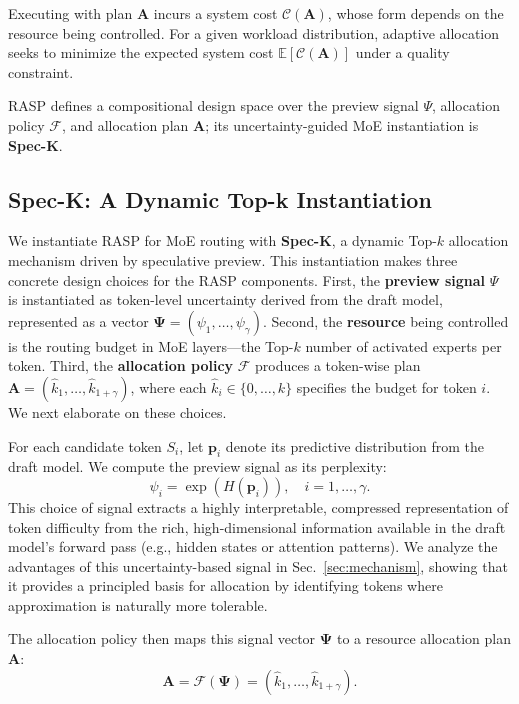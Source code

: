 \documentclass[conference]{IEEEtran}
\theoremstyle{definition} %
\begin{document}
Executing with plan $\mathbf{A}$ incurs a system cost $\mathcal{C}(\mathbf{A})$, whose form depends on the resource being controlled. 
For a given workload distribution, adaptive allocation seeks to minimize the expected system cost $\mathbb{E}[\mathcal{C}(\mathbf{A})]$ under a quality constraint.

RASP defines a compositional design space over the preview signal $\Psi$, allocation policy $\mathcal{F}$, and allocation plan $\mathbf{A}$; its uncertainty-guided MoE instantiation is \textbf{Spec-K}.

\subsection{Spec-K: A Dynamic Top-k Instantiation} \label{sec:method:spec_k}

We instantiate RASP for MoE routing with \textbf{Spec-K}, a dynamic Top-$k$ allocation mechanism driven by speculative preview.
This instantiation makes three concrete design choices for the RASP components.
First, the \textbf{preview signal} $\Psi$ is instantiated as token-level uncertainty derived from the draft model, represented as a vector $\boldsymbol{\Psi} = (\psi_1,\dots,\psi_\gamma)$.
Second, the \textbf{resource} being controlled is the routing budget in MoE layers---the Top-$k$ number of activated experts per token.
Third, the \textbf{allocation policy} $\mathcal{F}$ produces a token-wise plan $\mathbf{A} = (\hat k_1,\dots,\hat k_{1+\gamma})$, where each $\hat k_i \in \{0,\dots,k\}$ specifies the budget for token $i$. We next elaborate on these choices.

For each candidate token $S_i$, let $\mathbf{p}_i$ denote its predictive distribution from the draft model.
We compute the preview signal as its perplexity:
\begin{equation}
\psi_i = \exp(H(\mathbf{p}_i)), \quad i = 1,\dots,\gamma.
\end{equation}
This choice of signal extracts a highly interpretable, compressed representation of token difficulty from the rich, high-dimensional information available in the draft model's forward pass (e.g., hidden states or attention patterns).
We analyze the advantages of this uncertainty-based signal in Sec.~\ref{sec:mechanism}, showing that it provides a principled basis for allocation by identifying tokens where approximation is naturally more tolerable.

The allocation policy then maps this signal vector $\boldsymbol{\Psi}$ to a resource allocation plan $\mathbf{A}$:
\begin{equation}
\mathbf{A} = \mathcal{F}(\boldsymbol{\Psi}) = (\hat k_1,\dots,\hat k_{1+\gamma}).
\end{equation}
\end{document}
